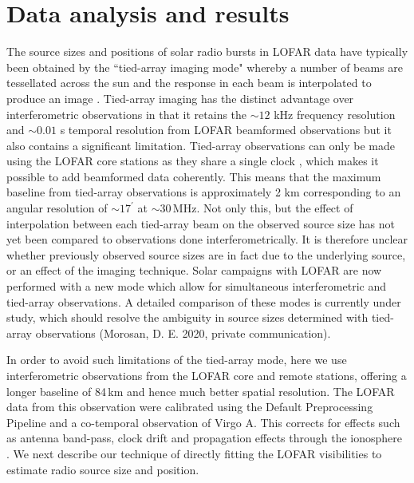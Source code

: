 \section{Data analysis and results} \label{sec:data}
The source sizes and positions of solar radio bursts in LOFAR data have typically been obtained by the ``tied-array imaging mode" \citep{Morosan2014} whereby a number of beams are tessellated across the sun and the response in each beam is interpolated to produce an image \citep[e.g.][]{Reid2017,Kontar2017,Zucca2018, Morosan2019}. Tied-array imaging has the distinct advantage over interferometric observations in that it retains the ${\sim} 12$ kHz frequency resolution and ${\sim} 0.01$ s temporal resolution from LOFAR beamformed observations but it also contains a significant limitation. Tied-array observations can only be made using the LOFAR core stations as they share a single clock \citep{DeGasperin2019}, which makes it possible to add beamformed data coherently. This means that the maximum baseline from tied-array observations is approximately 2 km corresponding to an angular resolution of ${\sim} 17^\prime$ at ${\sim} 30$\,MHz. Not only this, but the effect of interpolation between each tied-array beam on the observed source size has not yet been compared to observations done interferometrically. It is therefore unclear whether previously observed source sizes are in fact due to the underlying source, or an effect of the imaging technique. Solar campaigns with LOFAR are now performed with a new mode which allow for simultaneous interferometric and tied-array observations. A detailed comparison of these modes is currently under study, which should resolve the ambiguity in source sizes determined with tied-array observations (Morosan, D. E. 2020, private communication). 

In order to avoid such limitations of the tied-array mode, here we use interferometric observations from the LOFAR core and remote stations, offering a longer baseline of 84\,km and hence much better spatial resolution.
The LOFAR data from this observation were calibrated using the Default Preprocessing Pipeline \cite[DPPP;][]{VanDiepen2018} and a co-temporal observation of Virgo A. This corrects for effects such as antenna band-pass, clock drift and propagation effects through the ionosphere \citep{DeGasperin2019}. We next describe our technique of directly fitting the LOFAR visibilities to estimate radio source size and position.

